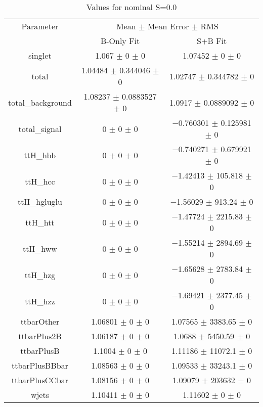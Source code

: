 \begin{table}
\centering
\caption{Values for nominal S=0.0}
\begin{tabular}{ccc}
\toprule
Parameter & \multicolumn{2}{c}{Mean $\pm$ Mean Error $\pm$ RMS}\\
 & B-Only Fit & S+B Fit\\
\midrule
singlet & \num{1.067} $\pm$ \num{0} $\pm$ \num{0} & \num{1.07452} $\pm$ \num{0} $\pm$ \num{0}\\
total & \num{1.04484} $\pm$ \num{0.344046} $\pm$ \num{0} & \num{1.02747} $\pm$ \num{0.344782} $\pm$ \num{0}\\
total\_background & \num{1.08237} $\pm$ \num{0.0883527} $\pm$ \num{0} & \num{1.0917} $\pm$ \num{0.0889092} $\pm$ \num{0}\\
total\_signal & \num{0} $\pm$ \num{0} $\pm$ \num{0} & \num{-0.760301} $\pm$ \num{0.125981} $\pm$ \num{0}\\
ttH\_hbb & \num{0} $\pm$ \num{0} $\pm$ \num{0} & \num{-0.740271} $\pm$ \num{0.679921} $\pm$ \num{0}\\
ttH\_hcc & \num{0} $\pm$ \num{0} $\pm$ \num{0} & \num{-1.42413} $\pm$ \num{105.818} $\pm$ \num{0}\\
ttH\_hgluglu & \num{0} $\pm$ \num{0} $\pm$ \num{0} & \num{-1.56029} $\pm$ \num{913.24} $\pm$ \num{0}\\
ttH\_htt & \num{0} $\pm$ \num{0} $\pm$ \num{0} & \num{-1.47724} $\pm$ \num{2215.83} $\pm$ \num{0}\\
ttH\_hww & \num{0} $\pm$ \num{0} $\pm$ \num{0} & \num{-1.55214} $\pm$ \num{2894.69} $\pm$ \num{0}\\
ttH\_hzg & \num{0} $\pm$ \num{0} $\pm$ \num{0} & \num{-1.65628} $\pm$ \num{2783.84} $\pm$ \num{0}\\
ttH\_hzz & \num{0} $\pm$ \num{0} $\pm$ \num{0} & \num{-1.69421} $\pm$ \num{2377.45} $\pm$ \num{0}\\
ttbarOther & \num{1.06801} $\pm$ \num{0} $\pm$ \num{0} & \num{1.07565} $\pm$ \num{3383.65} $\pm$ \num{0}\\
ttbarPlus2B & \num{1.06187} $\pm$ \num{0} $\pm$ \num{0} & \num{1.0688} $\pm$ \num{5450.59} $\pm$ \num{0}\\
ttbarPlusB & \num{1.1004} $\pm$ \num{0} $\pm$ \num{0} & \num{1.11186} $\pm$ \num{11072.1} $\pm$ \num{0}\\
ttbarPlusBBbar & \num{1.08563} $\pm$ \num{0} $\pm$ \num{0} & \num{1.09533} $\pm$ \num{33243.1} $\pm$ \num{0}\\
ttbarPlusCCbar & \num{1.08156} $\pm$ \num{0} $\pm$ \num{0} & \num{1.09079} $\pm$ \num{203632} $\pm$ \num{0}\\
wjets & \num{1.10411} $\pm$ \num{0} $\pm$ \num{0} & \num{1.11602} $\pm$ \num{0} $\pm$ \num{0}\\
\bottomrule
\end{tabular}
\end{table}